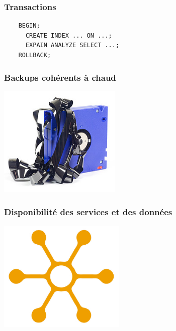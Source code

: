 \documentclass{beamer}
\begin{document}
\begin{frame}[fragile]
  \frametitle{Transactions}

  \begin{verbatim}
    BEGIN;
      CREATE INDEX ... ON ...;
      EXPAIN ANALYZE SELECT ...;
    ROLLBACK;
  \end{verbatim}
\end{frame}

\begin{frame}
  \frametitle{Backups cohérents à chaud}

  \begin{center}
    \includegraphics[height=2.1in]{online-backup.jpg}
  \end{center}
\end{frame}

\begin{frame}
  \frametitle{Disponibilité des services et des données}

  \begin{center}
    \includegraphics[height=2.1in]{distribution.jpg}
  \end{center}
\end{frame}
\end{document}
